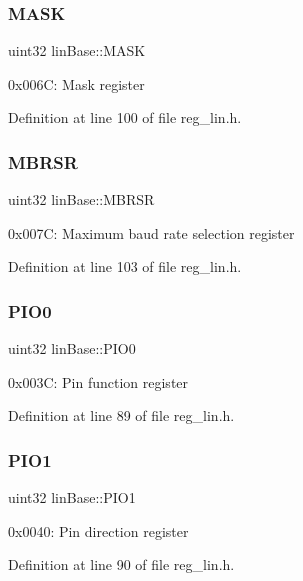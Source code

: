\subsubsection{\texorpdfstring{M\+A\+SK}{MASK}}
{\footnotesize\ttfamily uint32 lin\+Base\+::\+M\+A\+SK}

0x006C\+: Mask register 

Definition at line 100 of file reg\+\_\+lin.\+h.

\mbox{\label{structlinBase_a457acf5cadc80a1de9ceb0f3cbf4278c}} 
\subsubsection{\texorpdfstring{M\+B\+R\+SR}{MBRSR}}
{\footnotesize\ttfamily uint32 lin\+Base\+::\+M\+B\+R\+SR}

0x007C\+: Maximum baud rate selection register 

Definition at line 103 of file reg\+\_\+lin.\+h.

\mbox{\label{structlinBase_a24c4e796301118bb73689b2a5d2df71f}} 
\subsubsection{\texorpdfstring{P\+I\+O0}{PIO0}}
{\footnotesize\ttfamily uint32 lin\+Base\+::\+P\+I\+O0}

0x003C\+: Pin function register 

Definition at line 89 of file reg\+\_\+lin.\+h.

\mbox{\label{structlinBase_aa9b30d4e56ecfaa76956fd5d65cbf822}} 
\subsubsection{\texorpdfstring{P\+I\+O1}{PIO1}}
{\footnotesize\ttfamily uint32 lin\+Base\+::\+P\+I\+O1}

0x0040\+: Pin direction register 

Definition at line 90 of file reg\+\_\+lin.\+h.

\mbox{\label{structlinBase_a3b2d40bfcf8c97ab2143e0fbbba8c6cf}} 
